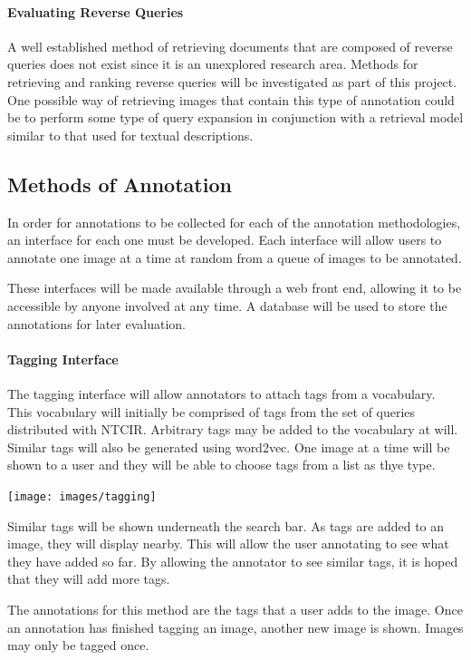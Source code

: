 \documentclass[12pt,a4paper]{article}
\begin{document}
\paragraph{Evaluating Reverse Queries}
A well established method of retrieving documents that are composed of reverse queries does not exist since it is an unexplored research area. Methods for retrieving and ranking reverse queries will be investigated as part of this project. One possible way of retrieving images that contain this type of annotation could be to perform some type of query expansion in conjunction with a retrieval model similar to that used for textual descriptions.

\subsection{Methods of Annotation}
In order for annotations to be collected for each of the annotation methodologies, an interface for each one must be developed. Each interface will allow users to annotate one image at a time at random from a queue of images to be annotated. 

These interfaces will be made available through a web front end, allowing it to be accessible by anyone involved at any time. A database will be used to store the annotations for later evaluation.

\paragraph{Tagging Interface}
The tagging interface will allow annotators to attach tags from a vocabulary. This vocabulary will initially be comprised of tags from the set of queries distributed with NTCIR. Arbitrary tags may be added to the vocabulary at will. Similar tags will also be generated using word2vec. One image at a time will be shown to a user and they will be able to choose tags from a list as thye type.

\begin{center}
    \texttt{[image: images/tagging]}
\end{center}

Similar tags will be shown underneath the search bar. As tags are added to an image, they will display nearby. This will allow the user annotating to see what they have added so far. By allowing the annotator to see similar tags, it is hoped that they will add more tags. 

The annotations for this method are the tags that a user adds to the image. Once an annotation has finished tagging an image, another new image is shown. Images may only be tagged once.
\end{document}
